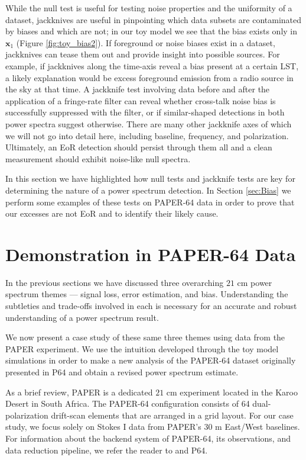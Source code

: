 \documentclass[preprint2,numberedappendix,tighten]{aastex6}  %
\begin{document}
While the null test is useful for testing noise properties and the uniformity of a dataset, jackknives are useful in pinpointing which data subsets are contaminated by biases and which are not; in our toy model we see that the bias exists only in $\textbf{x}_{1}$ (Figure \ref{fig:toy_bias2}). If foreground or noise biases exist in a dataset, jackknives can tease them out and provide insight into possible sources. For example, if jackknives along the time-axis reveal a bias present at a certain LST, a likely explanation would be excess foreground emission from a radio source in the sky at that time. A jackknife test involving data before and after the application of a fringe-rate filter can reveal whether cross-talk noise bias is successfully suppressed with the filter, or if similar-shaped detections in both power spectra suggest otherwise. There are many other jackknife axes of which we will not go into detail here, including baseline, frequency, and polarization. Ultimately, an EoR detection should persist through them all and a clean measurement should exhibit noise-like null spectra.

In this section we have highlighted how null tests and jackknife tests are key for determining the nature of a power spectrum detection. In Section \ref{sec:Bias} we perform some examples of these tests on PAPER-64 data in order to prove that our excesses are not EoR and to identify their likely cause. 


\section{Demonstration in PAPER-64 Data}
\label{sec:CaseStudy}

In the previous sections we have discussed three overarching $21$ cm power spectrum themes --- signal loss, error estimation, and bias. Understanding the subtleties and trade-offs involved in each is necessary for an accurate and robust understanding of a power spectrum result. 

We now present a case study of these same three themes using data from the PAPER experiment. We use the intuition developed through the toy model simulations in order to make a new analysis of the PAPER-64 dataset originally presented in P64 and obtain a revised power spectrum estimate.

As a brief review, PAPER is a dedicated $21$ cm experiment located in the Karoo Desert in South Africa. The PAPER-64 configuration consists of 64 dual-polarization drift-scan elements that are arranged in a grid layout. For our case study, we focus solely on Stokes I data from PAPER's $30$ m East/West baselines. For information about the backend system of PAPER-64, its observations, and data reduction pipeline, we refer the reader to \citet{parsons_et_al2010} and P64.
\end{document}
